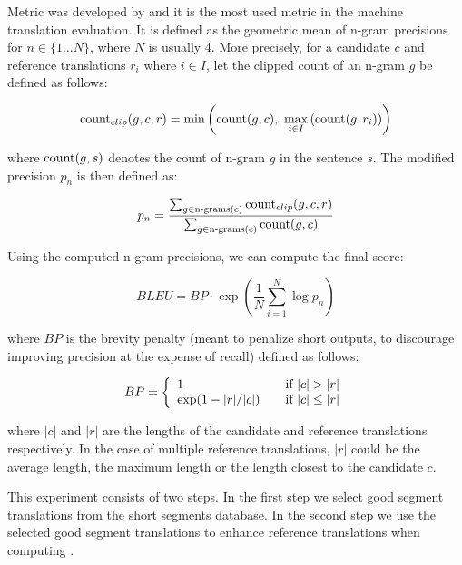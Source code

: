 Metric  was developed by  and it is the
most used metric in the machine translation evaluation. It is defined as the
geometric mean of n-gram precisions for $n \in \{1 \ldots N\}$, where $N$ is
usually 4. More precisely, for a candidate $c$ and reference translations $r_i$
where $i \in I$, let the clipped count of an n-gram $g$ be defined as follows:

\begin{equation*}
    \text{count}_{clip}(g,c,r) = \min \left( \operatorname{count}(g, c), ~ \max_{i \in I} \left( \operatorname{count}(g, r_i) \right) \right)
\end{equation*}

\noindent where $\operatorname{count}(g, s)$ denotes the count of n-gram $g$ in the sentence
$s$. The modified precision $p_n$ is then defined as:

\begin{equation*}
    p_n = \frac{
        \sum_{g \in \text{n-grams}(c)} \text{count}_{clip}(g,c,r)
    }{
        \sum_{g \in \text{n-grams}(c)} \operatorname{count}(g,c)
    }
\end{equation*}

\noindent Using the computed n-gram precisions, we can compute the final
 score:

\begin{equation*}
        BLEU = BP \cdot \exp \left( \frac{1}{N} \sum_{i = 1}^N \log p_n \right) 
\end{equation*}

\noindent where $BP$ is the brevity penalty (meant to penalize short outputs, to
discourage improving precision at the expense of recall) defined as follows:

\begin{equation*}
    BP = \left\{ 
  \begin{array}{l l}
    1 & \quad \text{if } |c| > |r|\\
    \exp(1-|r|/|c|) & \quad \text{if } |c| \leq |r| \\
    \end{array} \right.
\end{equation*}

\noindent where $|c|$ and $|r|$ are the lengths of the candidate and reference
translations respectively. In the case of multiple reference translations,
$|r|$ could be the average length, the maximum length or the length closest to
the candidate $c$.

This experiment consists of two steps. In the first step we select good segment
translations from the short segments database. In the second step we use the
selected good segment translations to enhance reference translations when
computing .


